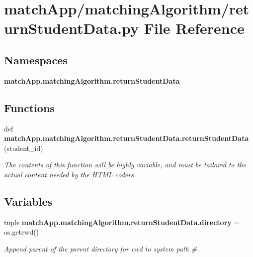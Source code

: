 \section{match\+App/matching\+Algorithm/return\+Student\+Data.py File Reference}
\label{return_student_data_8py}
\subsection*{Namespaces}
\begin{DoxyCompactItemize}
\item 
 {\bf match\+App.\+matching\+Algorithm.\+return\+Student\+Data}
\end{DoxyCompactItemize}
\subsection*{Functions}
\begin{DoxyCompactItemize}
\item 
def {\bf match\+App.\+matching\+Algorithm.\+return\+Student\+Data.\+return\+Student\+Data} (student\+\_\+id)
\begin{DoxyCompactList}\small\item\em The contents of this function will be highly variable, and must be tailored to the actual content needed by the H\+T\+M\+L coders. \end{DoxyCompactList}\end{DoxyCompactItemize}
\subsection*{Variables}
\begin{DoxyCompactItemize}
\item 
tuple {\bf match\+App.\+matching\+Algorithm.\+return\+Student\+Data.\+directory} = os.\+getcwd()
\begin{DoxyCompactList}\small\item\em Append parent of the parent directory for cwd to system path \#. \end{DoxyCompactList}\end{DoxyCompactItemize}
